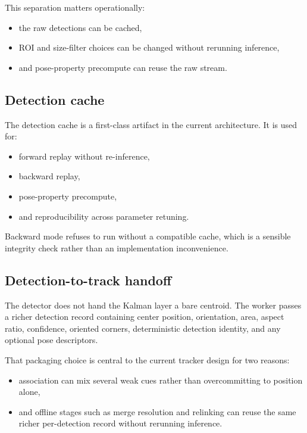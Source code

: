\documentclass[11pt]{article}
\begin{document}
This separation matters operationally:

\begin{itemize}
  \item the raw detections can be cached,
  \item ROI and size-filter choices can be changed without rerunning inference,
  \item and pose-property precompute can reuse the raw stream.
\end{itemize}

\subsection{Detection cache}

The detection cache is a first-class artifact in the current architecture. It is used for:

\begin{itemize}
  \item forward replay without re-inference,
  \item backward replay,
  \item pose-property precompute,
  \item and reproducibility across parameter retuning.
\end{itemize}

Backward mode refuses to run without a compatible cache, which is a sensible integrity check rather than an implementation inconvenience.

\subsection{Detection-to-track handoff}

The detector does not hand the Kalman layer a bare centroid. The worker passes a richer detection record containing center position, orientation, area, aspect ratio, confidence, oriented corners, deterministic detection identity, and any optional pose descriptors.

That packaging choice is central to the current tracker design for two reasons:

\begin{itemize}
  \item association can mix several weak cues rather than overcommitting to position alone,
  \item and offline stages such as merge resolution and relinking can reuse the same richer per-detection record without rerunning inference.
\end{itemize}
\end{document}
